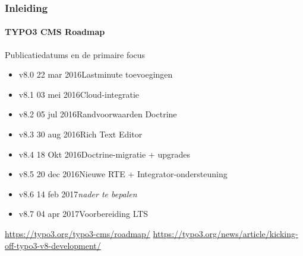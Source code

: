 \begin{frame}[fragile]
	\frametitle{Inleiding}
	\framesubtitle{TYPO3 CMS Roadmap}

	Publicatiedatums en de primaire focus

	\begin{itemize}

		\item v8.0 \tabto{1.1cm}22 mar 2016\tabto{3.4cm}Lastminute toevoegingen
		\item v8.1 \tabto{1.1cm}03 mei 2016\tabto{3.4cm}Cloud-integratie
		\item v8.2 \tabto{1.1cm}05 jul 2016\tabto{3.4cm}Randvoorwaarden Doctrine
		\item v8.3 \tabto{1.1cm}30 aug 2016\tabto{3.4cm}Rich Text Editor
		\item
			\begingroup
				\color{typo3orange}
					v8.4 \tabto{1.1cm}18 Okt 2016\tabto{3.4cm}Doctrine-migratie + upgrades
			\endgroup
		\item v8.5 \tabto{1.1cm}20 dec 2016\tabto{3.4cm}Nieuwe RTE + Integrator-ondersteuning
		\item v8.6 \tabto{1.1cm}14 feb 2017\tabto{3.4cm}\textit{nader te bepalen}
		\item v8.7 \tabto{1.1cm}04 apr 2017\tabto{3.4cm}Voorbereiding LTS

	\end{itemize}

	\smaller
		\url{https://typo3.org/typo3-cms/roadmap/}\newline
		\url{https://typo3.org/news/article/kicking-off-typo3-v8-development/}
	\normalsize

\end{frame}

